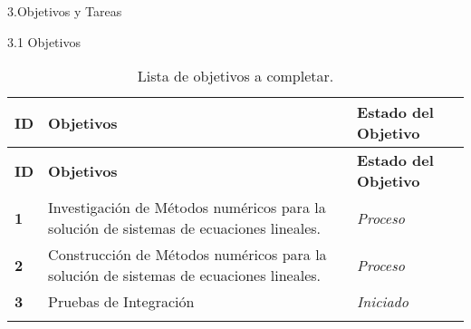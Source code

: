 \documentclass[12pt]{report}
\numberwithin{equation}{section}
\begin{document}
\begin{flushleft}
\large{3.Objetivos y Tareas}\\
\vspace{1em}


\large{3.1 Objetivos}\\
\vspace{1em}

\begin{longtable}[H]{|m{0.5cm}|m{7cm}|m{5.5cm}|}
\hline
\small{\textbf{ID}} & \small{\textbf{Objetivos}} & \small{\textbf{Estado del Objetivo}} \\
\hline \hline
\endfirsthead
\hline
\small{\textbf{ID}} & \small{\textbf{Objetivos}} & \small{\textbf{Estado del Objetivo}} \\
\hline \hline
\endhead
\hline
\endfoot

\endlastfoot
\textbf{1}  & \small{Investigaci\'on de M\'etodos num\'ericos para la soluci\'on de sistemas de ecuaciones lineales. } & \small{\textit{Proceso}}\\
\hline 
\textbf{2}  & \small{Construcci\'on de M\'etodos num\'ericos para la soluci\'on de sistemas de ecuaciones lineales.} & \small{\textit{Proceso}}\\
\hline 
\textbf{3}  & \small{Pruebas de Integraci\'on} & \small{\textit{Iniciado}}\\
\hline
\hline
\caption{{\footnotesize Lista de objetivos a completar.}}
\label{tabla: TABLA CE quinta plan}
\end{longtable}



\end{flushleft}
\end{document}
